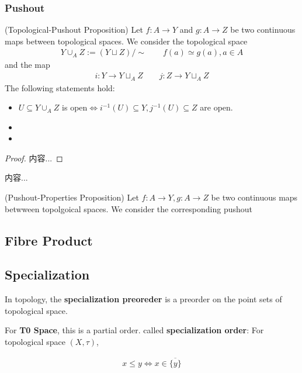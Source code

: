 \documentclass[Total.tex]{subfiles}
\begin{document}
				\subsubsection{Pushout}
				\begin{proposition}
					(Topological-Pushout Proposition) Let $f:A\rightarrow Y$ and $g:A\rightarrow Z$ be two continuous maps between topological spaces. We consider the topological space
					\begin{gather*}
						Y\cup_A Z:=(Y\sqcup Z)/\sim\qquad f(a)\simeq g(a),a\in A
					\end{gather*}
					and the map
					\begin{gather*}
						i:Y\rightarrow Y\sqcup_A Z\qquad j:Z\rightarrow Y\sqcup_A Z
					\end{gather*}
					The following statements hold:
					\begin{itemize}
						\item $U\subseteq Y\cup_A Z$ is open$\Leftrightarrow i^{-1}(U)\subseteq Y,j^{-1}(U)\subseteq Z$ are open.
						\item 
						\item 
					\end{itemize}
				\end{proposition}
				\begin{proof}
					内容...
				\end{proof}
				
				\begin{Def}
					内容...
				\end{Def}
				\begin{proposition}
					(Pushout-Properties Proposition) Let $f:A\rightarrow Y,g:A\rightarrow Z$ be two continuous maps betwween topolgoical spaces. We consider the corresponding pushout 
				\end{proposition}
			\subsection{Fibre Product}
			\subsection{Specialization}
				\begin{Def}
					In topology, the \textbf{specialization preoreder} is a preorder on the point sets of topological space.
					
					For \textbf{T0 Space}, this is a partial order. called \textbf{specialization order}: For topological space $(X,\tau)$,
					
					\begin{gather*}
						x\leq y\Leftrightarrow x\in \overline{\{y\}}
					\end{gather*}
				\end{Def}
				
\end{document}
